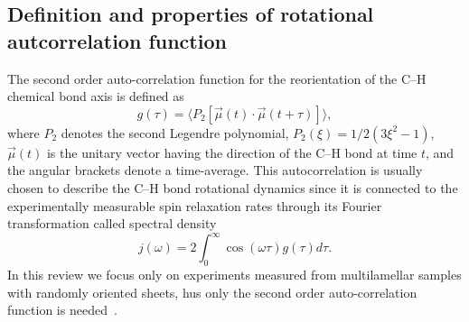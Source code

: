 \documentclass[aps,prl,superscriptaddress,twocolumn]{revtex4}
\begin{document}

\subsection{Definition and properties of rotational autcorrelation function}
The second order auto-correlation function for the reorientation of the C--H chemical bond axis is defined as \cite{Lipari82}
\begin{equation}\label{gt}
g(\tau) = \langle P_2[\vec{\mu}(t)\cdot\vec{\mu}(t+\tau)]\rangle,
\end{equation} 
where $P_2$ denotes the second Legendre polynomial, $P_2(\xi) = 1/2 (3\xi^2 - 1)$, $\vec{\mu}(t)$ is the unitary vector having the 
direction of the C--H bond at time $t$, and the angular brackets denote a time-average. This autocorrelation is usually chosen
to describe the C--H bond rotational dynamics since it is connected to the experimentally measurable spin relaxation rates 
through its Fourier transformation called spectral density
\begin{equation}\label{FT}
j(\omega) =  2\int_0^{\infty} \cos(\omega \tau) g(\tau) d\tau.
\end{equation}
In this review we focus only on experiments measured from multilamellar samples with randomly oriented sheets, 
hus only the second order auto-correlation function is needed~\cite{??}. 
\end{document}
